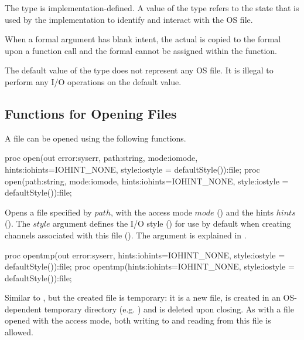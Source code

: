 The  type is implementation-defined.
A value of the  type refers to the state that is used
by the implementation to identify and interact with the OS file.

When a  formal argument has blank intent, the
actual is copied to the formal upon a function call and
the formal cannot be assigned within the function.

The default value of the  type does not represent any OS file.
It is illegal to perform any I/O operations on the default value.


\subsection{Functions for Opening Files}
\label{IO_open_file}

A file can be opened using the following functions.

\begin{protohead}
proc open(out error:syserr, path:string, mode:iomode, hints:iohints=IOHINT_NONE,
          style:iostyle = defaultStyle()):file;
proc open(path:string, mode:iomode, hints:iohints=IOHINT_NONE, style:iostyle = defaultStyle()):file;
\end{protohead}
\begin{protobody}
Opens a file specified by $path$, with
the access mode $mode$ ()
and the hints $hints$ ().
The $style$ argument defines the I/O style ()
for use by default when creating channels associated with this file
().
The  argument is explained in .
\end{protobody}

\begin{protohead}
proc opentmp(out error:syserr, hints:iohints=IOHINT_NONE, style:iostyle = defaultStyle()):file;
proc opentmp(hints:iohints=IOHINT_NONE, style:iostyle = defaultStyle()):file;
\end{protohead}
\begin{protobody}
Similar to , but the created file is temporary:
it is a new file, is created in an OS-dependent temporary directory (e.g. )
and is deleted upon closing.
As with a file opened with the  access mode,
both writing to and reading from this file is allowed.
\end{protobody}

